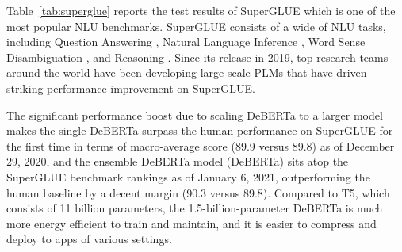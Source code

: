 \documentclass{article}
\begin{document}
Table~\ref{tab:superglue} reports the test results of SuperGLUE \citep{wang2019superglue} which is one of the most popular NLU benchmarks. 
SuperGLUE consists of a wide of NLU tasks, including  
Question Answering \citep{clark2019boolq, khashabi2018multirc, zhang2018record}, 
Natural Language Inference \citep{rte1,rte2,rte3, rte5}, Word Sense Disambiguation \citep{pilehvar2019wic}, and Reasoning \citep{levesque2011winograd,roemmele2011choice}. 
Since its release in 2019, top research teams around the world have been developing large-scale PLMs that have driven striking performance improvement on SuperGLUE. 

The significant performance boost due to scaling DeBERTa to a larger model makes the single DeBERTa surpass the human performance on SuperGLUE for the first time in terms of macro-average score (89.9 versus 89.8) as of December 29, 2020, and the ensemble DeBERTa model (DeBERTa) sits atop the SuperGLUE benchmark rankings as of January 6, 2021, outperforming the human baseline by a decent margin (90.3 versus 89.8). 
Compared to T5, which consists of 11 billion parameters, the 1.5-billion-parameter DeBERTa is much more energy efficient to train and maintain, and it is easier to compress and deploy to apps of various settings.
\end{document}

